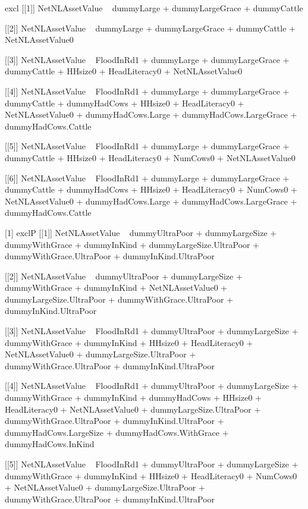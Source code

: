 \begin{Schunk}
\begin{Soutput}
[1] excl
[[1]]
NetNLAssetValue ~ dummyLarge + dummyLargeGrace + dummyCattle

[[2]]
NetNLAssetValue ~ dummyLarge + dummyLargeGrace + dummyCattle + 
    NetNLAssetValue0

[[3]]
NetNLAssetValue ~ FloodInRd1 + dummyLarge + dummyLargeGrace + 
    dummyCattle + HHsize0 + HeadLiteracy0 + NetNLAssetValue0

[[4]]
NetNLAssetValue ~ FloodInRd1 + dummyLarge + dummyLargeGrace + 
    dummyCattle + dummyHadCows + HHsize0 + HeadLiteracy0 + NetNLAssetValue0 + 
    dummyHadCows.Large + dummyHadCows.LargeGrace + dummyHadCows.Cattle

[[5]]
NetNLAssetValue ~ FloodInRd1 + dummyLarge + dummyLargeGrace + 
    dummyCattle + HHsize0 + HeadLiteracy0 + NumCows0 + NetNLAssetValue0

[[6]]
NetNLAssetValue ~ FloodInRd1 + dummyLarge + dummyLargeGrace + 
    dummyCattle + dummyHadCows + HHsize0 + HeadLiteracy0 + NumCows0 + 
    NetNLAssetValue0 + dummyHadCows.Large + dummyHadCows.LargeGrace + 
    dummyHadCows.Cattle

[1] exclP
[[1]]
NetNLAssetValue ~ dummyUltraPoor + dummyLargeSize + dummyWithGrace + 
    dummyInKind + dummyLargeSize.UltraPoor + dummyWithGrace.UltraPoor + 
    dummyInKind.UltraPoor

[[2]]
NetNLAssetValue ~ dummyUltraPoor + dummyLargeSize + dummyWithGrace + 
    dummyInKind + NetNLAssetValue0 + dummyLargeSize.UltraPoor + 
    dummyWithGrace.UltraPoor + dummyInKind.UltraPoor

[[3]]
NetNLAssetValue ~ FloodInRd1 + dummyUltraPoor + dummyLargeSize + 
    dummyWithGrace + dummyInKind + HHsize0 + HeadLiteracy0 + 
    NetNLAssetValue0 + dummyLargeSize.UltraPoor + dummyWithGrace.UltraPoor + 
    dummyInKind.UltraPoor

[[4]]
NetNLAssetValue ~ FloodInRd1 + dummyUltraPoor + dummyLargeSize + 
    dummyWithGrace + dummyInKind + dummyHadCows + HHsize0 + HeadLiteracy0 + 
    NetNLAssetValue0 + dummyLargeSize.UltraPoor + dummyWithGrace.UltraPoor + 
    dummyInKind.UltraPoor + dummyHadCows.LargeSize + dummyHadCows.WithGrace + 
    dummyHadCows.InKind

[[5]]
NetNLAssetValue ~ FloodInRd1 + dummyUltraPoor + dummyLargeSize + 
    dummyWithGrace + dummyInKind + HHsize0 + HeadLiteracy0 + 
    NumCows0 + NetNLAssetValue0 + dummyLargeSize.UltraPoor + 
    dummyWithGrace.UltraPoor + dummyInKind.UltraPoor


\end{Soutput}
\end{Schunk}
